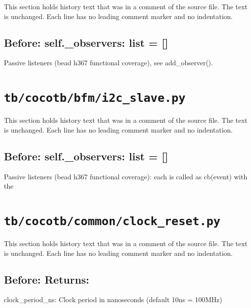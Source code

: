 This section holds history text that was in a comment of the source file. The text is unchanged. Each line has no leading comment marker and no indentation.

\begin{record}

\subsection*{Before: self.\_observers: list = []}

\begin{textblock}
Passive listeners (bead h367 functional coverage), see add_observer().
\end{textblock}

\end{record}

\section{\texttt{tb/cocotb/bfm/i2c\_slave.py}}\label{cr:suite:bfm-i2c-slave}

This section holds history text that was in a comment of the source file. The text is unchanged. Each line has no leading comment marker and no indentation.

\begin{record}

\subsection*{Before: self.\_observers: list = []}

\begin{textblock}
Passive listeners (bead h367 functional coverage): each is called as cb(event) with the
\end{textblock}

\end{record}

\section{\texttt{tb/cocotb/common/clock\_reset.py}}\label{cr:suite:common-clock-reset}

This section holds history text that was in a comment of the source file. The text is unchanged. Each line has no leading comment marker and no indentation.

\begin{record}

\subsection*{Before: Returns:}

\begin{textblock}
clock_period_ns: Clock period in nanoseconds (default 10ns = 100MHz)
\end{textblock}

\end{record}

